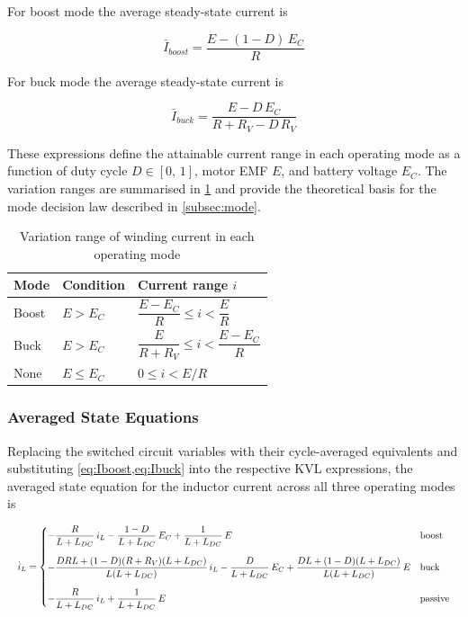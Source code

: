 For boost mode the average steady-state current is

\begin{equation}
    \bar{I}_{boost} =
        \frac{E - (1-D)\,E_C}{R}
    \label{eq:Iboost}
\end{equation}

For buck mode the average steady-state current is

\begin{equation}
    \bar{I}_{buck} =
        \frac{E - D\,E_C}{R + R_V - D\,R_V}
    \label{eq:Ibuck}
\end{equation}

These expressions define the attainable current range in each
operating mode as a function of duty cycle $D \in [0,\,1]$, motor
EMF $E$, and battery voltage $E_C$. The variation ranges are
summarised in \cref{tab:current_range} and provide the theoretical
basis for the mode decision law described in \cref{subsec:mode}.

\begin{table}[htbp]
    \centering
    \caption{Variation range of winding current in each operating mode}
    \label{tab:current_range}
    \renewcommand{\arraystretch}{1.3}
    \begin{tabular}{lll}
        \toprule
        Mode    & Condition      & Current range $i$ \\
        \midrule
        Boost   & $E > E_C$
                & $\dfrac{E - E_C}{R} \leq i < \dfrac{E}{R}$ \\[8pt]
        Buck    & $E > E_C$
                & $\dfrac{E}{R+R_V} \leq i < \dfrac{E-E_C}{R}$ \\[8pt]
        None    & $E \leq E_C$   & $0 \leq i < E/R$ \\
        \bottomrule
    \end{tabular}
\end{table}

\subsubsection{Averaged State Equations}
\label{subsubsec:avg_state}

Replacing the switched circuit variables with their cycle-averaged
equivalents and substituting \cref{eq:Iboost,eq:Ibuck} into the
respective KVL expressions, the averaged state equation for the
inductor current across all three operating modes is

\begin{equation}
\resizebox{\linewidth}{!}{$
    \dot{i}_L =
    \begin{cases}
        \displaystyle
        -\frac{R}{L+L_{DC}}\,i_L -\frac{1-D}{L+L_{DC}}\,E_C +\frac{1}{L+L_{DC}}\,E 
        & \text{boost}\\[15pt]
        \displaystyle
        -\frac{DRL+(1-D)(R+R_V)(L+L_{DC})}{L(L+L_{DC})}\,i_L -\frac{D}{L+L_{DC}}\,E_C +\frac{DL+(1-D)(L+L_{DC})}{L(L+L_{DC})}\,E 
        & \text{buck}\\[15pt]
        \displaystyle
        -\frac{R}{L+L_{DC}}\,i_L +\frac{1}{L+L_{DC}}\,E 
        & \text{passive}
    \end{cases}
$}
\label{eq:diL}
\end{equation}

